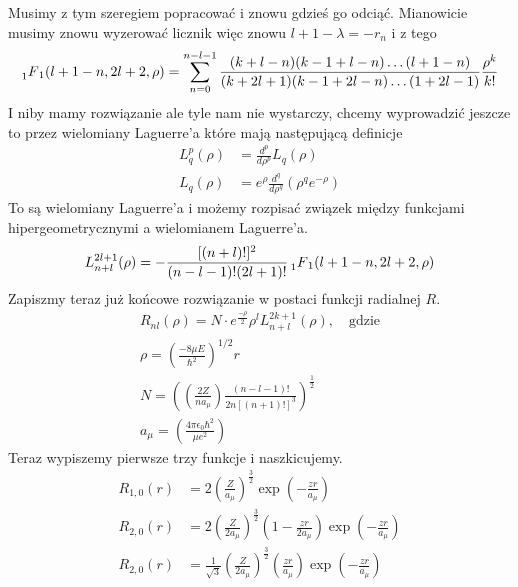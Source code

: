 Musimy z tym szeregiem popracować i znowu gdzieś go odciąć.
Mianowicie musimy znowu wyzerować licznik więc znowu $l + 1 - \lambda = -r_n$ i z tego
\begin{equation*}
	\prescript{}{1}{F}_{1}(l + 1 - n, 2l+2, \rho) = \sum_{n=0}^{n - l -1} \frac{(k+l - n)(k -1+l-n)\dots(l+1-n)}{(k+2l+1)(k-1+2l - n)\dots(1 + 2l - 1)} \frac{\rho^k}{k!}
\end{equation*}
I niby mamy rozwiązanie ale tyle nam nie wystarczy, chcemy wyprowadzić jeszcze to przez wielomiany Laguerre'a które mają następującą definicje
\begin{equation*}
	\begin{split}
		L_q^p(\rho)&= \frac{d^p}{d \rho^p}L_q(\rho) \\
		L_q(\rho) &= e^{\rho} \frac{d^q}{d \rho^q}\left(\rho^q e^{-\rho}\right)
	\end{split}
\end{equation*}
To są wielomiany Laguerre'a i możemy rozpisać związek między funkcjami
hipergeometrycznymi a wielomianem Laguerre'a.
\begin{equation*}
	L_{n+l}^{2l+1}(\rho) = -\frac{[(n+l)!]^2}{(n-l-1)!(2l+1)!} \prescript{}{1}{F}_{1}(l + 1 - n, 2l+2, \rho) 
\end{equation*}
Zapiszmy teraz już końcowe rozwiązanie w postaci funkcji radialnej $R$.
\begin{equation*}
	\begin{gathered}
		R_{n l}(\rho)=N \cdot e^{\frac{-\rho}{2}} \rho^{l} L_{n+l}^{2 k+1}(\rho), \quad \text{gdzie} \\
		\rho=\left(\frac{-8\mu E}{\hbar^2}\right)^{1/2}r \\
		N = \left( \left( \frac{2Z}{n a_{\mu}} \right) \frac{(n - l - 1)!}{2n[(n+1)!]^3} \right)^{\frac{1}{2}} \\
		a_{\mu} = \left(\frac{4 \pi \epsilon_0 \hbar^2}{\mu e^2}\right)
	\end{gathered}
\end{equation*}
Teraz wypiszemy pierwsze trzy funkcje i naszkicujemy.
\begin{equation*}
	\begin{split}
		R_{1,0}(r) &=  2 \left(\frac{Z}{a_{\mu}}\right)^{\frac32} \exp(-\frac{zr}{a_{\mu}}) \\
		R_{2,0}(r) &=  2 \left(\frac{Z}{2a_{\mu}}\right)^{\frac32}\left(1 - \frac{zr}{2a_{\mu}}\right) \exp(-\frac{zr}{a_{\mu}}) \\
		R_{2,0}(r) &=  \frac{1}{\sqrt{3}} \left(\frac{Z}{2a_{\mu}}\right)^{\frac32} \left(\frac{zr}{a_{\mu}}\right) \exp(-\frac{zr}{a_{\mu}})
	\end{split}
\end{equation*}
